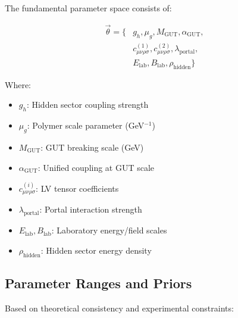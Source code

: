 \documentclass[11pt]{article}
\begin{document}
The fundamental parameter space consists of:

\begin{align}
\vec{\theta} = \{&g_h, \mu_g, M_{\text{GUT}}, \alpha_{\text{GUT}}, \\
                &c_{\mu\nu\rho\sigma}^{(1)}, c_{\mu\nu\rho\sigma}^{(2)}, \lambda_{\text{portal}}, \\
                &E_{\text{lab}}, B_{\text{lab}}, \rho_{\text{hidden}}\}
\end{align}

Where:
\begin{itemize}
    \item $g_h$: Hidden sector coupling strength
    \item $\mu_g$: Polymer scale parameter (GeV$^{-1}$)
    \item $M_{\text{GUT}}$: GUT breaking scale (GeV)
    \item $\alpha_{\text{GUT}}$: Unified coupling at GUT scale
    \item $c_{\mu\nu\rho\sigma}^{(i)}$: LV tensor coefficients
    \item $\lambda_{\text{portal}}$: Portal interaction strength
    \item $E_{\text{lab}}, B_{\text{lab}}$: Laboratory energy/field scales
    \item $\rho_{\text{hidden}}$: Hidden sector energy density
\end{itemize}

\subsection{Parameter Ranges and Priors}

Based on theoretical consistency and experimental constraints:
\end{document}
